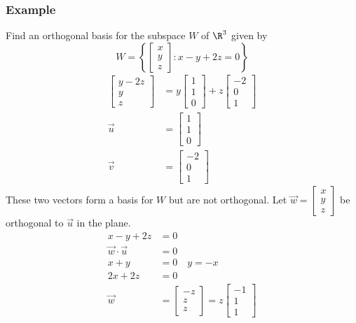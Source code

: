 \documentclass{math}
\begin{document}
\subsubsection*{Example}
Find an orthogonal basis for the subspace \( W \) of \( \R^3 \) given by
\[ W = \left\{\begin{bmatrix}x \\ y \\ z\end{bmatrix}: x-y+2z = 0\right\} \]
\begin{align*}
  \begin{bmatrix}
    y-2z \\ y \\ z
  \end{bmatrix} &= y\begin{bmatrix}
    1 \\ 1 \\ 0
  \end{bmatrix}+z\begin{bmatrix}
    -2 \\ 0 \\ 1
  \end{bmatrix} \\
  \vec{u} &= \begin{bmatrix}1 \\ 1 \\ 0\end{bmatrix} \\
  \vec{v} &= \begin{bmatrix}-2 \\ 0 \\ 1\end{bmatrix}
\end{align*}
These two vectors form a basis for \( W \) but are not orthogonal. Let
\( \vec{w} = \begin{bmatrix}x \\ y \\z\end{bmatrix} \) be orthogonal to
\( \vec{u} \) in the plane.
\begin{align*}
  x-y+2z &= 0 \\
  \vec{w}\cdot\vec{u} &= 0 \\
  x+y &= 0 \quad y = -x \\
  2x+2z &= 0 \\
  \vec{w} &= \begin{bmatrix}-z \\ z \\ z\end{bmatrix} = z\begin{bmatrix}
    -1 \\ 1 \\ 1
  \end{bmatrix}
\end{align*}
\end{document}
